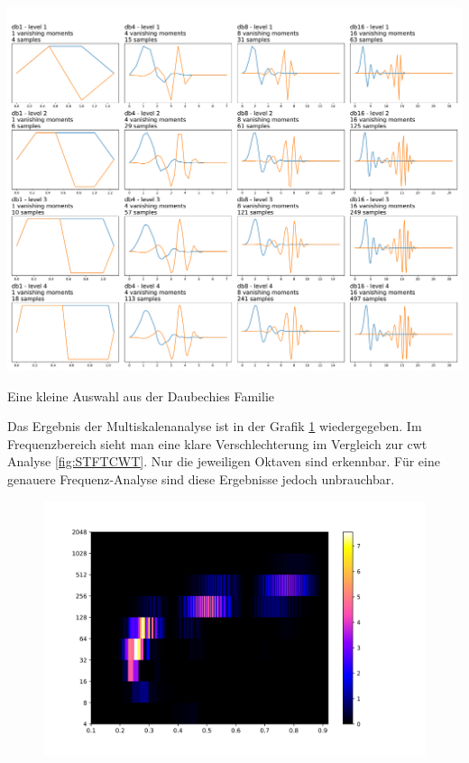 \begin{table}[!ht]
	\includegraphics[width=\linewidth]{papers/autotune/sections/frequenzanalyse/images/DaubechiesFamilie.pdf}
	\caption{Eine kleine Auswahl aus der Daubechies Familie}
	\label{tab:Daubechies}
\end{table}

Das Ergebnis der Multiskalenanalyse ist in der Grafik \ref{fig:sin-sweep} wiedergegeben. Im Frequenzbereich sieht man eine klare Verschlechterung im Vergleich zur cwt Analyse  \ref{fig:STFTCWT}. Nur die jeweiligen Oktaven sind erkennbar. Für eine genauere Frequenz-Analyse sind diese Ergebnisse jedoch unbrauchbar.  


\begin{figure}[!ht]
	\centering
	\includegraphics[width=\linewidth]{papers/autotune/sections/frequenzanalyse/images/sweepdwt.jpg}
	\label{fig:sin-sweep}
\end{figure}%




